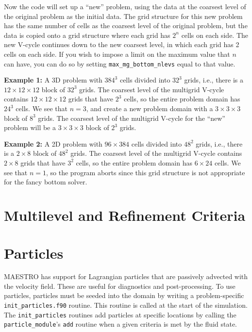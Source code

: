 Now the code will set up a ``new'' problem, using the data at the coarsest level
of the original problem as the initial data.  The grid structure for this new
problem has the same number of cells as the coarsest level of the original problem,
but the data is copied onto a grid structure where each grid has $2^n$ cells
on each side.  The new V-cycle continues down to the new coarsest level, in
which each grid has 2 cells on each side.  If you wish to impose a limit on
the maximum value that $n$ can have, you can do so by setting 
{\tt max\_mg\_bottom\_nlevs} equal to that value.

{\bf Example 1:} A 3D problem with $384^3$ cells divided into $32^3$ grids, i.e., 
there is a $12\times 12\times 12$ block of $32^3$ grids.  The coarsest level of the 
multigrid V-cycle contains $12\times 12\times 12$ grids that have $2^3$ cells, so the 
entire problem domain has $24^3$ cells.  We see that $n=3$, and create a new problem 
domain with a $3\times 3\times 3$ block of $8^3$ grids.  The coarsest level of the 
multigrid V-cycle for the ``new'' problem will be a $3\times 3\times 3$ block of 
$2^3$ grids.

{\bf Example 2:} A 2D problem with $96\times 384$ cells divided into $48^2$ grids, i.e., 
there is a $2\times 8$ block of $48^2$ grids.  The coarsest level of the multigrid 
V-cycle contains $2\times 8$ grids that have $3^2$ cells, so the entire problem 
domain has $6\times 24$ cells.  We see that $n=1$, so the program aborts since this grid
structure is not appropriate for the fancy bottom solver.


\section{Multilevel and Refinement Criteria}


\section{Particles}

MAESTRO has support for Lagrangian particles that are passively
advected with the velocity field.  These are useful for diagnostics
and post-processing.  To use particles, particles must be seeded into
the domain by writing a problem-specific {\tt init\_particles.f90}
routine.  This routine is called at the start of the simulation.  The
{\tt init\_particles} routines add particles at specific locations by
calling the {\tt particle\_module}'s {\tt add} routine when a given
criteria is met by the fluid state.

